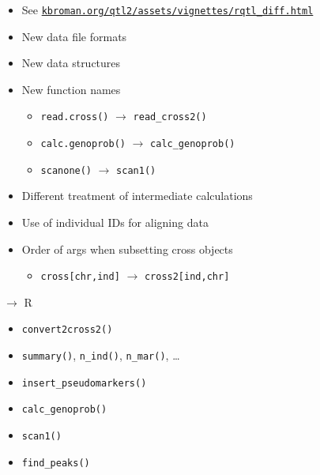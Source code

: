\documentclass[12pt]{article}
\newcommand{\headsize}{\fontsize{35}{35} \selectfont}
\newcommand{\smallsize}{\fontsize{25}{30} \selectfont}
\newcommand{\smallersize}{\fontsize{20}{25} \selectfont}
\newcommand{\smallestsize}{\fontsize{18}{22} \selectfont}
\begin{document}
\hfill \begin{minipage}[t]{9.5in}
\begin{itemize}
\setlength{\rightskip}{0pt plus 1fil} %
\item See
  \href{http://kbroman.org/qtl2/assets/vignettes/rqtl_diff.html}{\smallestsize
    \tt kbroman.org/qtl2/assets/vignettes/rqtl\_diff.html}
\item New data file formats
\item New data structures
\item New function names
  \begin{itemize}
  \item[] {\color{myblue} \smallersize \verb|read.cross()| $\rightarrow$ \verb|read_cross2()|}
  \item[] {\color{myblue} \smallersize \verb|calc.genoprob()| $\rightarrow$ \verb|calc_genoprob()|}
  \item[] {\color{myblue} \smallersize \verb|scanone()| $\rightarrow$ \verb|scan1()|}
  \end{itemize}
\item Different treatment of intermediate calculations
\item Use of individual IDs for aligning data
\item Order of args when subsetting cross objects
  \begin{itemize}
  \item[] {\color{myblue} \smallersize \verb|cross[chr,ind]| $\rightarrow$ \verb|cross2[ind,chr]|}
  \end{itemize}
\end{itemize} \end{minipage}




\newpage

\headsize \color{myyellow}
$\boldsymbol{\rightarrow}$ R

\vspace{3cm}

\color{mywhite} \smallsize

\hfill \begin{minipage}[t]{9.5in}
\begin{itemize}
\itemsep24pt
\item \verb|convert2cross2()|
\item \verb|summary()|, \verb|n_ind()|, \verb|n_mar()|, \dots
\item \verb|insert_pseudomarkers()|
\item \verb|calc_genoprob()|
\item \verb|scan1()|
\item \verb|find_peaks()|
\end{itemize} \end{minipage}
\end{document}
